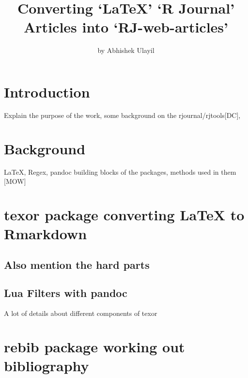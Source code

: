\title{Converting `LaTeX' `R Journal' Articles into `RJ-web-articles'}
\author{by Abhishek Ulayil}

\maketitle


\hypertarget{introduction}{%
\section{Introduction}\label{introduction}}

Explain the purpose of the work, some background on the rjournal/rjtools{[}DC{]},

\hypertarget{background}{%
\section{Background}\label{background}}

LaTeX, Regex, pandoc
building blocks of the packages, methods used in them {[}MOW{]}

\hypertarget{texor-package-converting-latex-to-rmarkdown}{%
\section{texor package converting LaTeX to Rmarkdown}\label{texor-package-converting-latex-to-rmarkdown}}

\hypertarget{also-mention-the-hard-parts}{%
\subsection{Also mention the hard parts}\label{also-mention-the-hard-parts}}

\hypertarget{lua-filters-with-pandoc}{%
\subsection{Lua Filters with pandoc}\label{lua-filters-with-pandoc}}

A lot of details about different components of texor

\hypertarget{rebib-package-working-out-bibliography}{%
\section{rebib package working out bibliography}\label{rebib-package-working-out-bibliography}}

